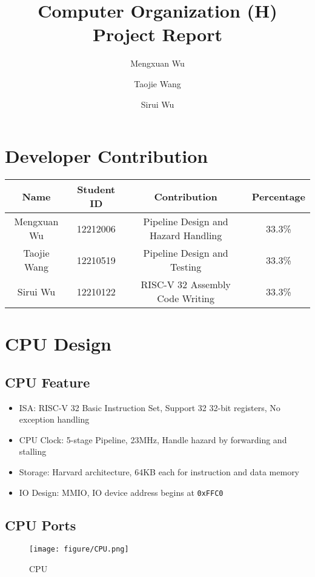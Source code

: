 \documentclass[a4paper,12pt]{article}
\title{\textbf{Computer Organization (H) Project Report}}
\author{Mengxuan Wu \and Taojie Wang \and Sirui Wu}
\date{\displaydate{date}}
\begin{document}
\maketitle

\section{Developer Contribution}

\begin{table}[H]
    \centering
    \begin{tabular}{cccc}
        \toprule
        Name & Student ID & Contribution & Percentage \\
        \midrule
        Mengxuan Wu & 12212006 & Pipeline Design and Hazard Handling & 33.3\% \\
        Taojie Wang & 12210519 & Pipeline Design and Testing  & 33.3\% \\
        Sirui Wu & 12210122 &  RISC-V 32 Assembly Code Writing& 33.3\%\\
        \bottomrule
    \end{tabular}
\end{table}

\section{CPU Design}

\subsection{CPU Feature}

\begin{itemize}
    \item ISA: RISC-V 32 Basic Instruction Set, Support 32 32-bit registers, No exception handling
    \item CPU Clock: 5-stage Pipeline, 23MHz, Handle hazard by forwarding and stalling
    \item Storage: Harvard architecture, 64KB each for instruction and data memory
    \item IO Design: MMIO, IO device address begins at \texttt{0xFFC0}
\end{itemize}

\subsection{CPU Ports}

\begin{figure}[H]
    \centering
    \texttt{[image: figure/CPU.png]}
    \caption{CPU}
    \label{fig:CPU}
\end{figure}
\end{document}
